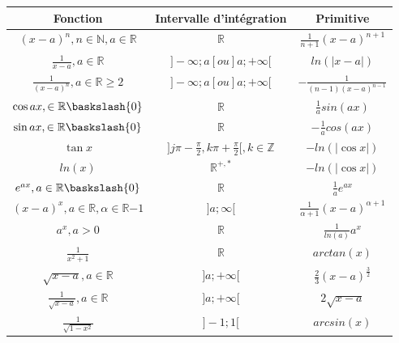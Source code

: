 \documentclass{article}
\begin{document}
\begin{center}
    \begin{tabular}{|c|c|c|}
    \hline
    Fonction& Intervalle d'intégration & Primitive \\
    \hline
    $(x-a)^n , n\in \mathbb{N}, a\in \mathbb{R}$ & $ \mathbb{R}$ & $\frac{1}{n+1}(x-a)^{n+1}$ \\
    \hline
    $\frac{1}{x-a}, a\in \mathbb{R}$& $] -\infty;a[ou]a;+\infty [$& $ln(|x-a|)$\\
    \hline
    $ \frac{1}{(x-a)^n}, a \in \mathbb{R} \geqslant 2 $ & $] -\infty;a[ou]a;+\infty [$ & $-\frac{1}{(n-1)(x-a)^{n-1}}$\\
    \hline
    $\cos{ax}, \in \mathbb{R}\baskslash {0}$ & $\mathbb{R}$ & $\frac{1}{a} sin(ax)$ \\
    \hline
    $\sin{ax}, \in \mathbb{R}\baskslash {0}$ & $\mathbb{R}$ & $-\frac{1}{a} cos(ax)$ \\
    \hline
    $\tan{x}$ & $] j\pi -\frac{\pi}{2}, k\pi + \frac{\pi}{2} [, k\in \mathbb{Z}$ & $-ln(|\cos{x}|)$ \\
    \hline
    $ln(x)$ & $\mathbb{R}^{+,*}$ & $ -ln(|\cos{x}|) $ \\
    \hline
    $e^{ax}, a\in \mathbb{R} \baskslash {0}$ & $\mathbb{R}$ & $\frac{1}{a}e^{ax}$ \\
    \hline
    $(x-a)^x, a\in \mathbb{R}, \alpha\in \mathbb{R} {-1}$ & $] a;\infty [$ & $ \frac{1}{\alpha+1}(x-a)^{\alpha+1} $\\
    \hline
    $a^x,a>0$ & $\mathbb{R}$ & $\frac{1}{ln(a)}a^x$ \\
    \hline
    $ \frac{1}{x^2+1} $ & $ \mathbb{R} $ & $ arctan(x)$ \\
    \hline
    $ \sqrt{x-a}, a \in \mathbb{R} $ & $ ] a;+\infty [ $ & $ \frac{2}{3}(x-a)^{\frac{3}{2}} $ \\
    \hline
    $\frac{1}{\sqrt{x-a}}, a \in \mathbb{R}$ & $] a;+\infty [$ & $2\sqrt{x-a}$\\
    \hline
    $\frac{1}{\sqrt{1-x^2}}$ & $] -1;1 [$ & $arcsin(x)$ \\
    \hline
    \end{tabular}
\end{center}
\end{document}
